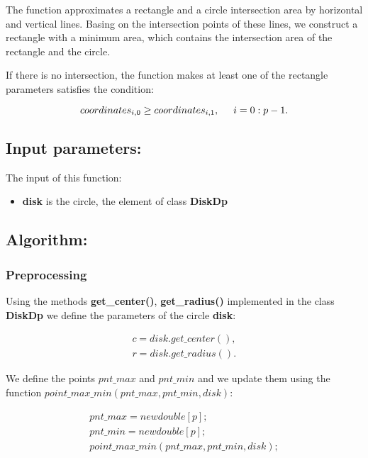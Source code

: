 \documentclass{report}
\begin{document}
The function approximates a rectangle and a circle intersection area by horizontal and vertical lines. Basing on the intersection points of these lines, we construct a rectangle with a minimum area, which contains the intersection area of the rectangle and the circle.

If there is no intersection, the function makes at least one of the rectangle parameters satisfies the condition: 

\begin{equation}
	coordinates_{i,0} \ge coordinates_{i,1} , \hspace*{5mm} i = 0:p-1.
	\label{eq:cond1}
\end{equation}

\subsection*{Input parameters:}

The input of this function:

\begin{itemize}
	\item {\bfseries disk}  is the circle, the element of class {\bfseries DiskDp} 
	
\end{itemize}

\subsection*{Algorithm:}

\subsubsection*{Preprocessing}

Using the methods {\bfseries get\_center()}, {\bfseries get\_radius()} implemented in the class {\bfseries DiskDp} we define the parameters of the circle {\bfseries disk}:

\begin{equation}
	\begin{gathered}
		c = disk.get\_center(),\\
		r = disk.get\_radius().
		\label{eq:paramdisk}
	\end{gathered}
\end{equation}

We define the points $pnt\_max$ and $pnt\_min$  and we update them using the function $point\_max\_min(pnt\_max, pnt\_min, disk)$:

\begin{equation}
	\begin{gathered}
		pnt\_max = new double[p];\\
		pnt\_min = new double[p];\\
		point\_max\_min(pnt\_max, pnt\_min, disk);
		\label{eq:pointsminmax}
	\end{gathered}
\end{equation}
\end{document}
